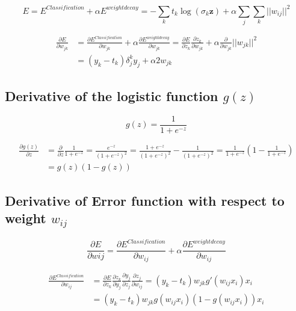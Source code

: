 \documentclass{article}
\begin{document}
\begin{equation}
E = E^{Classification}+\alpha E^{weightdecay} = -\sum_{k}t_k\log{(\sigma_k{\bm{z}})} + \alpha \sum_j\sum_k ||w_{ij}||^2
\end{equation}

\begin{align*}
	\frac{\partial E}{\partial w_{jk}} &= \frac{\partial E^{Classification}}{\partial w_{jk}}+\alpha \frac{\partial E^{weightdecay}}{\partial w_{jk}} = \frac{\partial E}{\partial z_k}\frac{\partial z_k}{\partial w_{jk}} + \alpha \frac{\partial}{\partial w_{jk}} ||w_{jk}||^2\\
	&= \left(y_k-t_k\right)\delta^{k}_{j}y_j + \alpha 2w_{jk}
\end{align*}




\subsection*{Derivative of the logistic function $g(z)$}

\begin{equation}
g(z) = \frac{1}{1+e^{-z}}
\end{equation}

\begin{align}
	\frac{\partial g(z)}{\partial z} &= \frac{\partial}{\partial z} \frac{1}{1+e^{-z}} = \frac{e^{-z}}{(1+e^{-z})^2} = \frac{1+e^{-z}}{(1+e^{-z})^2}-\frac{1}{(1+e^{-z})^2}= \frac{1}{1+e^{-z}}\left(1-\frac{1}{1+e^{-z}}\right)\\ &=g(z)(1-g(z))
\end{align}

\subsection*{Derivative of Error function with respect to weight $w_{ij}$}

\begin{equation}
\frac{\partial E}{\partial w{ij}} = \frac{\partial E^{Classification}}{\partial w_{ij}} + \alpha \frac{\partial E^{weightdecay}}{\partial w_{ij}}
\end{equation}

\begin{align*}
	\frac{\partial E^{Classification}}{\partial w_{ij}} &= \frac{\partial E}{\partial z_k}\frac{\partial z_k}{\partial y_j}\frac{\partial y_j}{\partial z_j}\frac{\partial z_j}{\partial w_{ij}} = (y_k-t_k)w_{jk} g'(w_{ij}x_i) x_i \\&= (y_k-t_k)w_{jk}g(w_{ij}x_i)(1-g(w_{ij}x_i))x_i
\end{align*}
\end{document}
